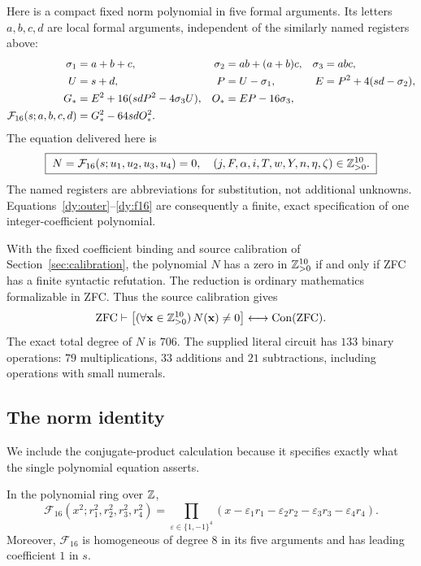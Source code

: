 Here is a compact fixed norm polynomial in five formal arguments.  Its
letters $a,b,c,d$ are local formal arguments, independent of the similarly
named registers above:
\begin{align}
 \sigma_1&=a+b+c,& \sigma_2&=ab+(a+b)c,& \sigma_3&=abc, \notag\\
 U&=s+d,& P&=U-\sigma_1,& E&=P^2+4(sd-\sigma_2), \notag\\
 G_*&=E^2+16(sdP^2-4\sigma_3U),&
 O_*&=EP-16\sigma_3, \notag\\
 \mathcal F_{16}(s;a,b,c,d)&=G_*^2-64sdO_*^2.
 \label{dy:f16}
\end{align}
The equation delivered here is
\begin{equation}
 \boxed{\;N=\mathcal F_{16}(s;u_1,u_2,u_3,u_4)=0,\quad
         (j,F,\alpha,i,T,w,Y,n,\eta,\zeta)\in\mathbb Z_{>0}^{10}.\;}
 \label{dy:equation}
\end{equation}
The named registers are abbreviations for substitution, not additional
unknowns.  Equations~\eqref{dy:outer}--\eqref{dy:f16} are consequently a
finite, exact specification of one integer-coefficient polynomial.

\begin{theorem}
\label{dy:main}
With the fixed coefficient binding and source calibration of
Section~\ref{sec:calibration}, the polynomial $N$ has a zero in
$\mathbb Z_{>0}^{10}$ if and only if ZFC has a finite syntactic refutation.
The reduction is ordinary mathematics formalizable in ZFC.  Thus the
source calibration gives
\[
 \mathrm{ZFC}\vdash
 \bigl[(\forall\mathbf x\in\mathbb Z_{>0}^{10})\,N(\mathbf x)\ne0\bigr]
       \longleftrightarrow\operatorname{Con}(\mathrm{ZFC}).
\]
The exact total degree of $N$ is $706$.  The supplied literal circuit has
$133$ binary operations: $79$ multiplications, $33$ additions and $21$
subtractions, including operations with small numerals.
\end{theorem}

\subsection{The norm identity}
\label{dy:normproof}

We include the conjugate-product calculation because it specifies exactly
what the single polynomial equation asserts.

\begin{lemma}
\label{dy:normlemma}
In the polynomial ring over $\mathbb Z$,
\begin{equation}
 \mathcal F_{16}(x^2;r_1^2,r_2^2,r_3^2,r_4^2)
 =\prod_{\varepsilon\in\{1,-1\}^4}
       (x-\varepsilon_1r_1-\varepsilon_2r_2
          -\varepsilon_3r_3-\varepsilon_4r_4).
 \label{dy:normidentity}
\end{equation}
Moreover, $\mathcal F_{16}$ is homogeneous of degree $8$ in its five
arguments and has leading coefficient $1$ in $s$.
\end{lemma}

